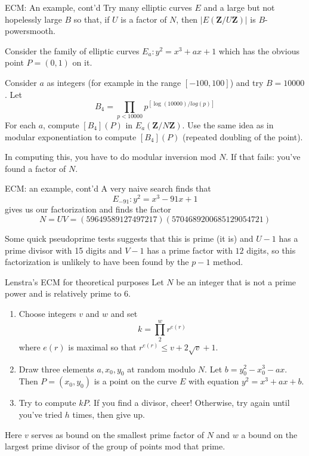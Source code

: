\documentclass{beamer}
\begin{document}
\begin{frame}{ECM: An example, cont'd}
Try many elliptic curves $E$ and a large but not hopelessly large $B$ so that, if $U$ is a factor of $N$, then
$|E(\mathbf{Z}/U\mathbf{Z})|$ is $B$-powersmooth.

\bigskip\noindent
Consider the family of elliptic curves $E_{a}:y^2=x^3+ax+1$ which has the obvious point $P=(0,1)$ on it.  

\bigskip\noindent
Consider $a$ as integers (for example in the range $[-100,100]$) and try $B=10000$.  Let
$$
B_{4}=\prod_{p<10000} p^{[\log (10000)/log(p)]}
$$
For each $a$, compute
$[B_4](P)$ in $E_{a}(\mathbf{Z}/N\mathbf{Z})$.  Use the same idea as in modular exponentiation to compute $[B_4](P)$ (repeated doubling of the point).  

\bigskip
In computing this, you have to do modular inversion mod $N$.  If that fails: you've found a factor of $N$.
\end{frame}
\begin{frame}{ECM: an example, cont'd}
A very naive search finds that 
$$
E_{-91}: y^2=x^3-91x+1
$$  
gives us our factorization and finds the factor 
$$N=UV=(59649589127497217)(5704689200685129054721)$$

\bigskip\noindent
Some quick pseudoprime tests suggests that this is prime (it is) and $U-1$ has a prime divisor with 15 digits and $V-1$
has a prime factor with $12$ digits,  so this factorization is unlikely to have been found by the $p-1$ method.
\end{frame}
\begin{frame}{Lenstra's ECM for theoretical purposes}
Let $N$ be an integer that is not a prime power and is relatively prime to
$6$. 
\begin{enumerate} 

\item Choose integers $v$ and $w$ and set
$$
k=\prod_{2}^{w} r^{e(r)}
$$
where $e(r)$ is maximal so that 
$r^{e(r)}\le v+2\sqrt{v}+1.
$
\item Draw three elements $a,x_0,y_0$ at random modulo $N$.  Let $b=y_0^2-x_0^3-ax$.  Then $P=(x_0,y_0)$ is a point on the curve
$E$ with equation $y^2=x^3+ax+b$.  
\item Try to compute $kP$.  If you find a divisor, cheer! Otherwise, try again until you've tried $h$ times, then give up.
\end{enumerate}
Here $v$ serves as bound on the smallest prime factor of $N$ and $w$ a bound on the largest prime divisor of the group of points mod that prime. 
\end{frame}
\end{document}
